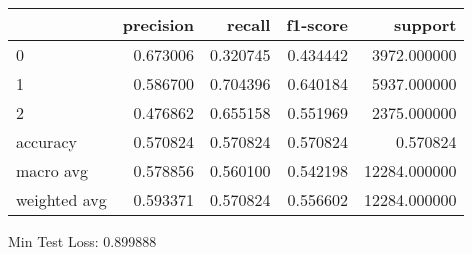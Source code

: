 \begin{tabular}{lrrrr}
\toprule
{} &  precision &    recall &  f1-score &       support \\
\midrule
0            &   0.673006 &  0.320745 &  0.434442 &   3972.000000 \\
1            &   0.586700 &  0.704396 &  0.640184 &   5937.000000 \\
2            &   0.476862 &  0.655158 &  0.551969 &   2375.000000 \\
accuracy     &   0.570824 &  0.570824 &  0.570824 &      0.570824 \\
macro avg    &   0.578856 &  0.560100 &  0.542198 &  12284.000000 \\
weighted avg &   0.593371 &  0.570824 &  0.556602 &  12284.000000 \\
\bottomrule
\end{tabular}

Min Test Loss: 0.899888